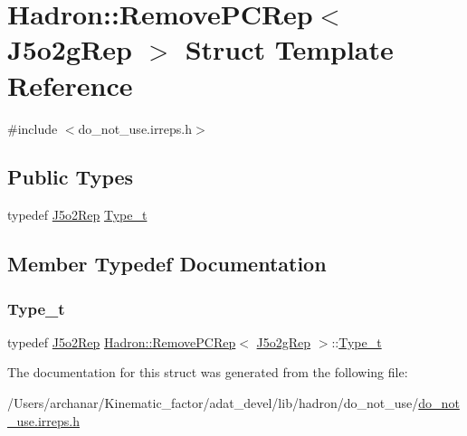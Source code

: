 \hypertarget{structHadron_1_1RemovePCRep_3_01J5o2gRep_01_4}{}\section{Hadron\+:\+:Remove\+P\+C\+Rep$<$ J5o2g\+Rep $>$ Struct Template Reference}
\label{structHadron_1_1RemovePCRep_3_01J5o2gRep_01_4}


{\ttfamily \#include $<$do\+\_\+not\+\_\+use.\+irreps.\+h$>$}

\subsection*{Public Types}
\begin{DoxyCompactItemize}
\item 
typedef \mbox{\hyperlink{structHadron_1_1J5o2Rep}{J5o2\+Rep}} \mbox{\hyperlink{structHadron_1_1RemovePCRep_3_01J5o2gRep_01_4_a2c403d167c34bc5b00820e498b1d6fd3}{Type\+\_\+t}}
\end{DoxyCompactItemize}


\subsection{Member Typedef Documentation}
\mbox{\label{structHadron_1_1RemovePCRep_3_01J5o2gRep_01_4_a2c403d167c34bc5b00820e498b1d6fd3}} 
\subsubsection{\texorpdfstring{Type\_t}{Type\_t}}
{\footnotesize\ttfamily typedef \mbox{\hyperlink{structHadron_1_1J5o2Rep}{J5o2\+Rep}} \mbox{\hyperlink{structHadron_1_1RemovePCRep}{Hadron\+::\+Remove\+P\+C\+Rep}}$<$ \mbox{\hyperlink{structHadron_1_1J5o2gRep}{J5o2g\+Rep}} $>$\+::\mbox{\hyperlink{structHadron_1_1RemovePCRep_3_01J5o2gRep_01_4_a2c403d167c34bc5b00820e498b1d6fd3}{Type\+\_\+t}}}



The documentation for this struct was generated from the following file\+:\begin{DoxyCompactItemize}
\item 
/\+Users/archanar/\+Kinematic\+\_\+factor/adat\+\_\+devel/lib/hadron/do\+\_\+not\+\_\+use/\mbox{\hyperlink{do__not__use_8irreps_8h}{do\+\_\+not\+\_\+use.\+irreps.\+h}}\end{DoxyCompactItemize}
